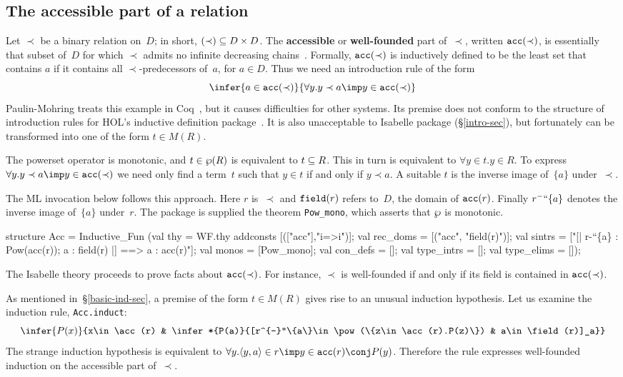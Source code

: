 \subsection{The accessible part of a relation}\label{acc-sec}
Let $\prec$ be a binary relation on~$D$; in short, $(\prec)\subseteq D\times D$.
The {\bf accessible} or {\bf well-founded} part of~$\prec$, written
${\tt acc}(\prec)$, is essentially that subset of~$D$ for which $\prec$ admits
no infinite decreasing chains~\cite{aczel77}.  Formally, ${\tt acc}(\prec)$ is
inductively defined to be the least set that contains $a$ if it contains
all $\prec$-predecessors of~$a$, for $a\in D$.  Thus we need an
introduction rule of the form 
\[ \infer{a\in\acc(\prec)}{\forall y.y\prec a\imp y\in\acc(\prec)} \]
Paulin-Mohring treats this example in Coq~\cite{paulin92}, but it causes
difficulties for other systems.  Its premise does not conform to 
the structure of introduction rules for HOL's inductive definition
package~\cite{camilleri92}.  It is also unacceptable to Isabelle package
(\S\ref{intro-sec}), but fortunately can be transformed into one of the
form $t\in M(R)$.

The powerset operator is monotonic, and $t\in\wp(R)$ is equivalent to
$t\subseteq R$.  This in turn is equivalent to $\forall y\in t. y\in R$.  To
express $\forall y.y\prec a\imp y\in\acc(\prec)$ we need only find a
term~$t$ such that $y\in t$ if and only if $y\prec a$.  A suitable $t$ is
the inverse image of~$\{a\}$ under~$\prec$.

The ML invocation below follows this approach.  Here $r$ is~$\prec$ and
${\tt field}(r)$ refers to~$D$, the domain of ${\tt acc}(r)$.  Finally $r^{-}``\{a\}$
denotes the inverse image of~$\{a\}$ under~$r$.  The package is supplied
the theorem {\tt Pow\_mono}, which asserts that $\wp$ is monotonic.
\begin{ttbox}
structure Acc = Inductive_Fun
 (val thy = WF.thy addconsts [(["acc"],"i=>i")];
  val rec_doms = [("acc", "field(r)")];
  val sintrs = 
      ["[| r-``\{a\} : Pow(acc(r));  a : field(r) |] ==> a : acc(r)"];
  val monos = [Pow_mono];
  val con_defs = [];
  val type_intrs = [];
  val type_elims = []);
\end{ttbox}
The Isabelle theory proceeds to prove facts about ${\tt acc}(\prec)$.  For
instance, $\prec$ is well-founded if and only if its field is contained in
${\tt acc}(\prec)$.  

As mentioned in~\S\ref{basic-ind-sec}, a premise of the form $t\in M(R)$
gives rise to an unusual induction hypothesis.  Let us examine the
induction rule, {\tt Acc.induct}:
\[ \infer{P(x)}{x\in\acc(r) &
     \infer*{P(a)}{[r^{-}``\{a\}\in\pow(\{z\in\acc(r).P(z)\}) & 
                   a\in\field(r)]_a}}
\]
The strange induction hypothesis is equivalent to
$\forall y. \pair{y,a}\in r\imp y\in\acc(r)\conj P(y)$.
Therefore the rule expresses well-founded induction on the accessible part
of~$\prec$.

